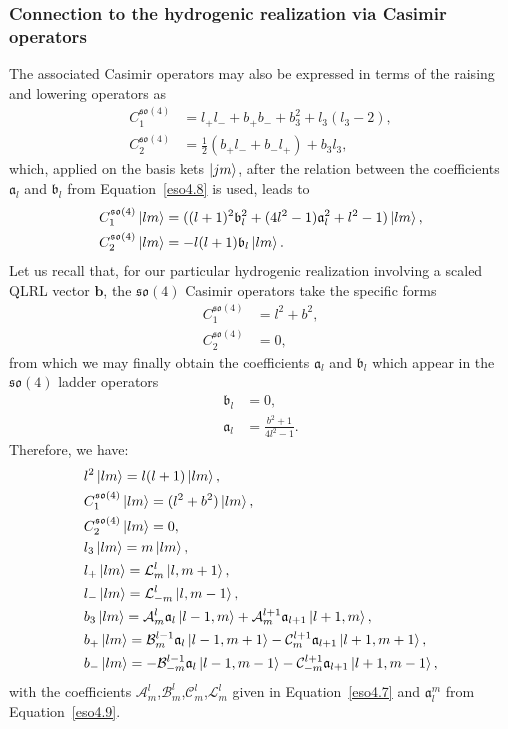 \documentclass[12pt,a4paper]{report}
\theoremstyle{definition}
\theoremstyle{remark}
\theoremstyle{remark}
\begin{document}
\subsubsection{Connection to the hydrogenic realization via Casimir operators}
The associated Casimir operators may also be expressed in terms of the raising and lowering operators as
\begin{align*}
C^{\mathfrak{so}(4)}_1&=l_+l_-+b_+b_-+b_3^2+l_3(l_3-2),\\
C^{\mathfrak{so}(4)}_2&=\frac{1}{2}(b_+l_-+b_-l_+)+b_3l_3,
\end{align*}
which, applied on the basis kets $\ket{jm}$, after the relation between the coefficients $\mathfrak{a}_l$ and $\mathfrak{b}_l$ from Equation~\ref{eso4.8} is used, leads to
\begin{align*}
C^{\mathfrak{so}(4)}_1\ket{lm}&=((l+1)^2\mathfrak{b}_l^2+(4l^2-1)\mathfrak{a}_l^2+l^2-1)\ket{lm},\\
C^{\mathfrak{so}(4)}_2\ket{lm}&=-l(l+1)\mathfrak{b}_l\ket{lm}.
\end{align*}
Let us recall that, for our particular hydrogenic realization involving a scaled QLRL vector $\textbf{b}$, the $\mathfrak{so}(4)$ Casimir operators take the specific forms
\begin{align*}
C^{\mathfrak{so}(4)}_1&=l^2+b^2,\\
C^{\mathfrak{so}(4)}_2&=0,
\end{align*}
from which we may finally obtain the coefficients $\mathfrak{a}_l$ and $\mathfrak{b}_l$ which appear in the $\mathfrak{so}(4)$ ladder operators
\begin{equation}\label{eso4.9}
\begin{aligned}
\mathfrak{b}_l&=0,\\
\mathfrak{a}_l&=\frac{b^2+1}{4l^2-1}.
\end{aligned}
\end{equation}
Therefore, we have:
\begin{equation}\label{eso4.10}
\begin{aligned}
&l^2\ket{lm}=l(l+1)\ket{lm},\\
&C^{\mathfrak{so}(4)}_1\ket{lm}=(l^2+b^2)\ket{lm},\\
&C^{\mathfrak{so}(4)}_2\ket{lm}=0,\\
&l_3\ket{lm}=m\ket{lm},\\
&l_+\ket{lm}=\mathcal{L}_m^l\ket{l,m+1},\\
&l_-\ket{lm}=\mathcal{L}_{-m}^l\ket{l,m-1},\\
&b_3\ket{lm}=\mathcal{A}_m^l\mathfrak{a}_l\ket{l-1,m}+\mathcal{A}_m^{l+1}\mathfrak{a}_{l+1}\ket{l+1,m},\\
&b_+\ket{lm}=\mathcal{B}_m^{l-1}\mathfrak{a}_l\ket{l-1,m+1}-\mathcal{C}_m^{l+1}\mathfrak{a}_{l+1}\ket{l+1,m+1},\\
&b_-\ket{lm}=-\mathcal{B}_{-m}^{l-1}\mathfrak{a}_l\ket{l-1,m-1}-\mathcal{C}_{-m}^{l+1}\mathfrak{a}_{l+1}\ket{l+1,m-1},
\end{aligned}
\end{equation}
with the coefficients $\mathcal{A}_m^l$,$\mathcal{B}_m^l$,$\mathcal{C}_m^l$,$\mathcal{L}_m^l$ given in Equation~\ref{eso4.7} and $\mathfrak{a}_l^m$ from Equation~\ref{eso4.9}.
\end{document}
